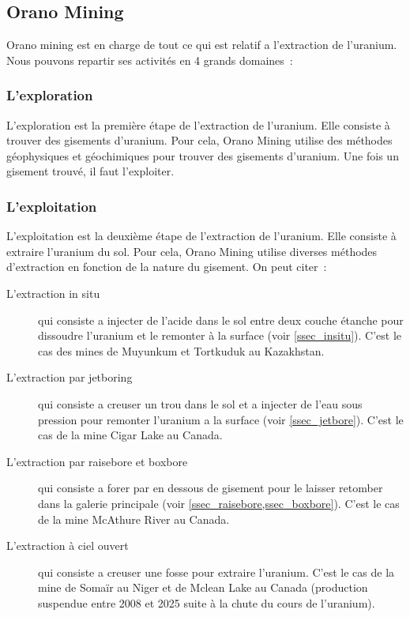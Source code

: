 \subsection{Orano Mining}

Orano mining est en charge de tout ce qui est relatif a l'extraction de l'uranium. Nous pouvons repartir ses activités en 4 grands domaines~:
\subsubsection{L'exploration}
L'exploration est la première étape de l'extraction de l'uranium. Elle consiste à trouver des gisements d'uranium. Pour cela, Orano Mining utilise des méthodes géophysiques et géochimiques pour trouver des gisements d'uranium. Une fois un gisement trouvé, il faut l'exploiter.

\subsubsection{L'exploitation}
L'exploitation est la deuxième étape de l'extraction de l'uranium. Elle consiste à extraire l'uranium du sol. Pour cela, Orano Mining utilise diverses méthodes d'extraction en fonction de la nature du gisement. On peut citer~:
\begin{description}
\item [L'extraction in situ] qui consiste a injecter de l'acide dans le sol entre deux couche étanche pour dissoudre l'uranium et le remonter à la surface (voir \cref{ssec_insitu}). C'est le cas des mines de Muyunkum et Tortkuduk au Kazakhstan.
\item [L'extraction par jetboring] qui consiste a creuser un trou dans le sol et a injecter de l'eau sous pression pour remonter l'uranium a la surface (voir \cref{ssec_jetbore}). C'est le cas de la mine Cigar Lake au Canada.
\item [L'extraction par raisebore et boxbore] qui consiste a forer par en dessous de gisement pour le laisser retomber dans la galerie principale (voir \cref{ssec_raisebore,ssec_boxbore}). C'est le cas de la mine McAthure River au Canada.
\item [L'extraction à ciel ouvert] qui consiste a creuser une fosse pour extraire l'uranium. C'est le cas de la mine de Somaïr au Niger et de Mclean Lake au Canada (production suspendue entre 2008 et 2025 suite à la chute du cours de l'uranium).
\end{description}


